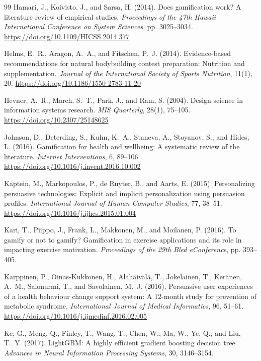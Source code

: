 \documentclass[12pt, a4paper]{report}
\begin{document}
\begin{thebibliography}{99}
Hamari, J., Koivisto, J., and Sarsa, H. (2014).
Does gamification work? A literature review of empirical studies.
\textit{Proceedings of the 47th Hawaii International Conference on System Sciences}, pp. 3025--3034.
\url{https://doi.org/10.1109/HICSS.2014.377}

Helms, E.~R., Aragon, A.~A., and Fitschen, P.~J. (2014).
Evidence-based recommendations for natural bodybuilding contest preparation: Nutrition and supplementation.
\textit{Journal of the International Society of Sports Nutrition}, 11(1), 20.
\url{https://doi.org/10.1186/1550-2783-11-20}

Hevner, A.~R., March, S.~T., Park, J., and Ram, S. (2004).
Design science in information systems research.
\textit{MIS Quarterly}, 28(1), 75--105.
\url{https://doi.org/10.2307/25148625}

Johnson, D., Deterding, S., Kuhn, K.~A., Staneva, A., Stoyanov, S., and Hides, L. (2016).
Gamification for health and wellbeing: A systematic review of the literature.
\textit{Internet Interventions}, 6, 89--106.
\url{https://doi.org/10.1016/j.invent.2016.10.002}

Kaptein, M., Markopoulos, P., de Ruyter, B., and Aarts, E. (2015).
Personalizing persuasive technologies: Explicit and implicit personalization using persuasion profiles.
\textit{International Journal of Human-Computer Studies}, 77, 38--51.
\url{https://doi.org/10.1016/j.ijhcs.2015.01.004}

Kari, T., Piippo, J., Frank, L., Makkonen, M., and Moilanen, P. (2016).
To gamify or not to gamify? Gamification in exercise applications and its role in impacting exercise motivation.
\textit{Proceedings of the 29th Bled eConference}, pp. 393--405.

Karppinen, P., Oinas-Kukkonen, H., Alah\"{a}iv\"{a}l\"{a}, T., Jokelainen, T., Ker\"{a}nen, A.~M., Salonurmi, T., and Savolainen, M.~J. (2016).
Persuasive user experiences of a health behaviour change support system: A 12-month study for prevention of metabolic syndrome.
\textit{International Journal of Medical Informatics}, 96, 51--61.
\url{https://doi.org/10.1016/j.ijmedinf.2016.02.005}

Ke, G., Meng, Q., Finley, T., Wang, T., Chen, W., Ma, W., Ye, Q., and Liu, T.~Y. (2017).
LightGBM: A highly efficient gradient boosting decision tree.
\textit{Advances in Neural Information Processing Systems}, 30, 3146--3154.


\end{thebibliography}
\end{document}
